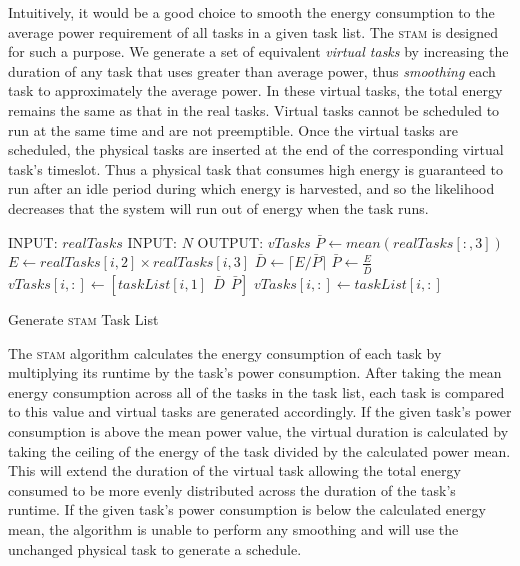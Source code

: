Intuitively, it would be a good choice to smooth the energy consumption to the average power requirement of all tasks in a given task list. The \textsc{stam} is designed for such a purpose. We generate a set of equivalent \emph{virtual tasks} by increasing the duration of any task that uses greater than average power, thus \emph{smoothing} each task to approximately the average power. In these virtual tasks, the total energy remains the same as that in the real tasks.  Virtual tasks cannot be scheduled to run at the same time and are not preemptible.  Once the virtual tasks are scheduled, the physical tasks are inserted at the end of the corresponding virtual task's timeslot.  Thus a physical task that consumes high energy is guaranteed to run after an idle period during which energy is harvested, and so the likelihood decreases that the system will run out of energy when the task runs. 

\begin{algorithm}[htb]
\label{stamalg}
\begin{algorithmic}
\STATE INPUT: $realTasks$  
\STATE INPUT: $N$ 
\STATE OUTPUT: $vTasks$ 
\STATE $\bar{P} \gets mean(realTasks[:,3])$
\STATE $E \gets realTasks[i, 2] \times realTasks[i,3]$
\STATE $\bar{D} \gets \lceil E / \bar{P} \rceil$
\STATE $\bar{P} \gets \frac{E}{\bar{D}}$
\STATE $vTasks[i,:] \gets [taskList[i,1]~~\bar{D}~~\bar{P}]$
\ELSE
\STATE $vTasks[i,:] \gets taskList[i,:]$
\ENDIF
\ENDFOR
\end{algorithmic}
\caption{Generate \textsc{stam} Task List}
\end{algorithm}

The \textsc{stam} algorithm calculates the energy consumption of each task by multiplying its runtime by the task's power consumption. After taking the mean energy consumption across all of the tasks in the task list, each task is compared to this value and virtual tasks are generated accordingly. If the given task's power consumption is above the mean power value, the virtual duration is calculated by taking the ceiling of the energy of the task divided by the calculated power mean. This will extend the duration of the virtual task allowing the total energy consumed to be more evenly distributed across the duration of the task's runtime. If the given task's power consumption is below the calculated energy mean, the algorithm is unable to perform any smoothing and will use the unchanged physical task to generate a schedule.

